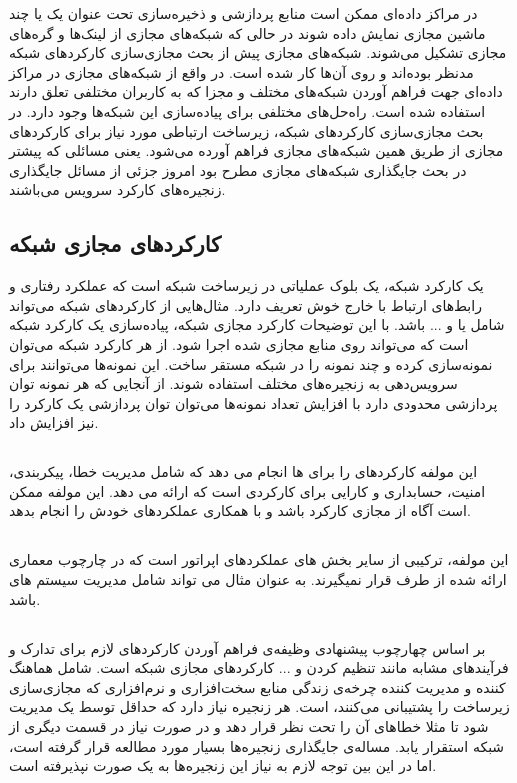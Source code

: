 در مراکز داده‌ای ممکن است منابع پردازشی و ذخیره‌سازی تحت عنوان یک یا چند
ماشین مجازی نمایش داده شوند در حالی که شبکه‌های مجازی از لینک‌ها و گره‌های مجازی تشکیل می‌شوند.
شبکه‌های مجازی پیش از بحث مجازی‌سازی کارکردهای شبکه مدنظر بوده‌اند و روی آن‌ها کار شده است.
در واقع از شبکه‌های مجازی در مراکز داده‌ای جهت فراهم آوردن شبکه‌های مختلف و مجزا که به کاربران مختلفی تعلق دارند
استفاده شده است. راه‌حل‌های مختلفی برای پیاده‌سازی این شبکه‌ها وجود دارد. در بحث مجازی‌سازی کارکردهای شبکه‌، زیرساخت ارتباطی
مورد نیاز 
برای کارکردهای مجازی از طریق همین شبکه‌های مجازی فراهم آورده می‌شود.
یعنی مسائلی که پیشتر در بحث جایگذاری شبکه‌های مجازی مطرح بود
امروز جزئی از مسائل جایگذاری زنجیره‌های کارکرد سرویس می‌باشند.

\subsection{کارکردهای مجازی شبکه}
یک کارکرد شبکه، یک بلوک عملیاتی در زیرساخت شبکه است که عملکرد رفتاری و رابط‌های ارتباط با خارج خوش تعریف دارد.
مثال‌هایی از کارکردهای شبکه می‌تواند شامل
یا
و ... باشد.
با این توضیحات کارکرد مجازی شبکه، پیاده‌سازی یک کارکرد شبکه است
که می‌تواند روی منابع مجازی شده اجرا شود.
از هر کارکرد شبکه می‌توان نمونه‌سازی کرده و چند نمونه را در شبکه مستقر ساخت. 
این نمونه‌ها می‌توانند برای سرویس‌دهی به زنجیره‌های مختلف استفاده شوند. از آنجایی که 
هر نمونه توان پردازشی محدودی دارد با افزایش تعداد نمونه‌ها می‌توان توان پردازشی یک کارکرد را نیز افزایش داد.

\subsection{}
این مولفه کارکردهای  را برای  ها انجام می دهد که شامل مدیریت خطا، پیکربندی، امنیت، حسابداری و کارایی برای کارکردی است که  ارائه می دهد. این مولفه ممکن است آگاه از مجازی کارکرد باشد و با همکاری  عملکردهای خودش را انجام بدهد.

\subsection{}
این مولفه، ترکیبی از سایر بخش های عملکردهای اپراتور است که در چارچوب معماری  ارائه شده از طرف  قرار نمیگیرند. به عنوان مثال می تواند شامل مدیریت سیستم های  باشد.

\subsection{}
بر اساس چهارچوب پیشنهادی 
وظیفه‌ی  فراهم آوردن کارکردهای لازم
برای تدارک و فرآیند‌های مشابه مانند تنظیم کردن و ... کارکردهای مجازی شبکه است.
 شامل هماهنگ کننده و مدیریت کننده چرخه‌ی زندگی
منابع سخت‌افزاری و نرم‌افزاری که مجازی‌سازی زیرساخت را پشتیبانی می‌کنند، است.
هر زنجیره نیاز دارد که حداقل توسط یک  مدیریت شود
تا مثلا خطاهای آن را تحت نظر قرار دهد و در صورت نیاز در قسمت دیگری از شبکه استقرار یابد.
مساله‌ی جایگذاری زنجیره‌ها بسیار مورد مطالعه قرار گرفته است، اما در این بین توجه لازم به نیاز این زنجیره‌ها به یک
صورت نپذیرفته است.

